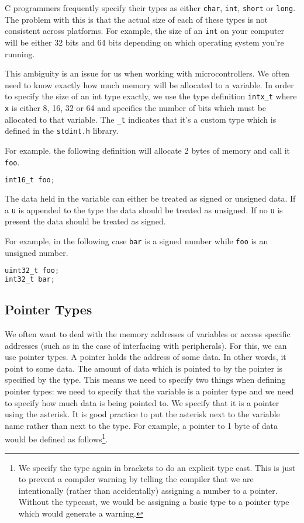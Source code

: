 C programmers frequently specify their types as either \texttt{char}, \texttt{int}, \texttt{short} or \texttt{long}. The problem with this is that the actual size of each of these types is not consistent across platforms. 
For example, the size of an \texttt{int} on your computer will be either 32 bits and 64 bits depending on which operating system you're running.

This ambiguity is an issue for us when working with microcontrollers. We often need to know exactly how much memory will be allocated to a variable. In order to specify the size of an int type exactly, we use the type definition \texttt{intx\_t} where \texttt{x} is either 8, 16, 32 or 64 and specifies the number of bits which must be allocated to that variable. The \texttt{\_t} indicates that it's a custom type which is defined in the \texttt{stdint.h} library. 

For example, the following definition will allocate 2 bytes of memory and call it \texttt{foo}.

\begin{lstlisting}[language=C]
int16_t foo;
\end{lstlisting}

The data held in the variable can either be treated as signed or unsigned data.
If a \texttt{u} is appended to the type the data should be treated as unsigned.
If no \texttt{u} is present the data should be treated as signed.

For example, in the following case \texttt{bar} is a signed number while \texttt{foo} is an unsigned number. 
\begin{lstlisting}[language=C]
uint32_t foo;
int32_t bar;
\end{lstlisting}

\subsection{Pointer Types}
We often want to deal with the memory addresses of variables or access specific addresses (such as in the case of interfacing with peripherals). For this, we can use pointer types. A pointer holds the address of some data. In other words, it point to some data.
The amount of data which is pointed to by the pointer is specified by the type. This means we need to specify two things when defining pointer types: we need to specify that the variable is a pointer type and we need to specify how much data is being pointed to.
We specify that it is a pointer using the asterisk. It is good practice to put the asterisk next to the variable name rather than next to the type.
For example, a pointer to 1 byte of data would be defined as follows\footnote{We specify the type again in brackets to do an explicit type cast. This is just to prevent a compiler warning by telling the compiler that we are intentionally (rather than accidentally) assigning a number to a pointer. Without the typecast, we would be assigning a basic type to a pointer type which would generate a warning.}.

